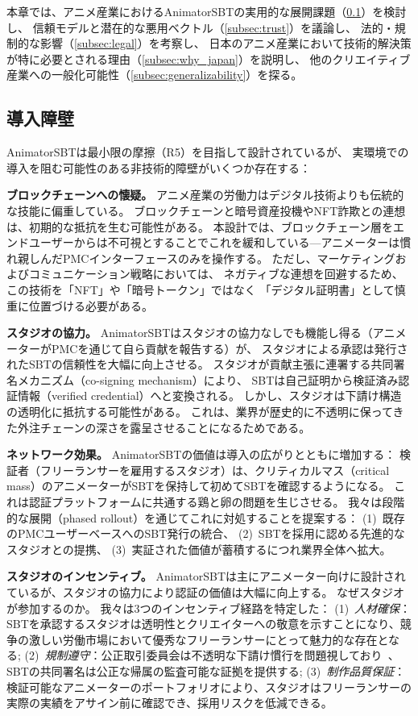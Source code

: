 
本章では、アニメ産業におけるAnimatorSBTの実用的な展開課題（\cref{subsec:adoption_barriers}）を検討し、
信頼モデルと潜在的な悪用ベクトル（\cref{subsec:trust}）を議論し、
法的・規制的な影響（\cref{subsec:legal}）を考察し、
日本のアニメ産業において技術的解決策が特に必要とされる理由（\cref{subsec:why_japan}）を説明し、
他のクリエイティブ産業への一般化可能性（\cref{subsec:generalizability}）を探る。

\subsection{導入障壁}
\label{subsec:adoption_barriers}

AnimatorSBTは最小限の摩擦（R5）を目指して設計されているが、
実環境での導入を阻む可能性のある非技術的障壁がいくつか存在する：

\textbf{ブロックチェーンへの懐疑。}
アニメ産業の労働力はデジタル技術よりも伝統的な技能に偏重している。
ブロックチェーンと暗号資産投機やNFT詐欺との連想は、初期的な抵抗を生む可能性がある。
本設計では、ブロックチェーン層をエンドユーザーからは不可視とすることでこれを緩和している---アニメーターは慣れ親しんだPMCインターフェースのみを操作する。
ただし、マーケティングおよびコミュニケーション戦略においては、
ネガティブな連想を回避するため、この技術を「NFT」や「暗号トークン」ではなく
「デジタル証明書」として慎重に位置づける必要がある。

\textbf{スタジオの協力。}
AnimatorSBTはスタジオの協力なしでも機能し得る（アニメーターがPMCを通じて自ら貢献を報告する）が、
スタジオによる承認は発行されたSBTの信頼性を大幅に向上させる。
スタジオが貢献主張に連署する共同署名メカニズム（co-signing mechanism）により、
SBTは自己証明から検証済み認証情報（verified credential）へと変換される。
しかし、スタジオは下請け構造の透明化に抵抗する可能性がある。
これは、業界が歴史的に不透明に保ってきた外注チェーンの深さを露呈させることになるためである。

\textbf{ネットワーク効果。}
AnimatorSBTの価値は導入の広がりとともに増加する：
検証者（フリーランサーを雇用するスタジオ）は、クリティカルマス（critical mass）のアニメーターがSBTを保持して初めてSBTを確認するようになる。
これは認証プラットフォームに共通する鶏と卵の問題を生じさせる。
我々は段階的な展開（phased rollout）を通じてこれに対処することを提案する：
(1)~既存のPMCユーザーベースへのSBT発行の統合、
(2)~SBTを採用に認める先進的なスタジオとの提携、
(3)~実証された価値が蓄積するにつれ業界全体へ拡大。

\textbf{スタジオのインセンティブ。}
AnimatorSBTは主にアニメーター向けに設計されているが、スタジオの協力により認証の価値は大幅に向上する。
なぜスタジオが参加するのか。
我々は3つのインセンティブ経路を特定した：
(1)~\textit{人材確保}：SBTを承認するスタジオは透明性とクリエイターへの敬意を示すことになり、競争の激しい労働市場において優秀なフリーランサーにとって魅力的な存在となる;
(2)~\textit{規制遵守}：公正取引委員会は不透明な下請け慣行を問題視しており~\cite{jftc2025anime}、SBTの共同署名は公正な帰属の監査可能な証拠を提供する;
(3)~\textit{制作品質保証}：検証可能なアニメーターのポートフォリオにより、スタジオはフリーランサーの実際の実績をアサイン前に確認でき、採用リスクを低減できる。

